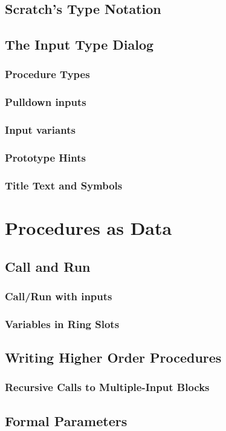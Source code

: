 \documentclass[a4paper]{report}
\begin{document}
\section{Scratch's Type Notation}
\section{The \Snap{} Input Type Dialog}
\subsection{Procedure Types}
\subsection{Pulldown inputs}
\subsection{Input variants}
\subsection{Prototype Hints}
\subsection{Title Text and Symbols}
\chapter{Procedures as Data}
\section{Call and Run}
\subsection{Call/Run with inputs}
\subsection{Variables in Ring Slots}
\section{Writing Higher Order Procedures}
\subsection{Recursive Calls to Multiple-Input Blocks}
\section{Formal Parameters}
\end{document}
